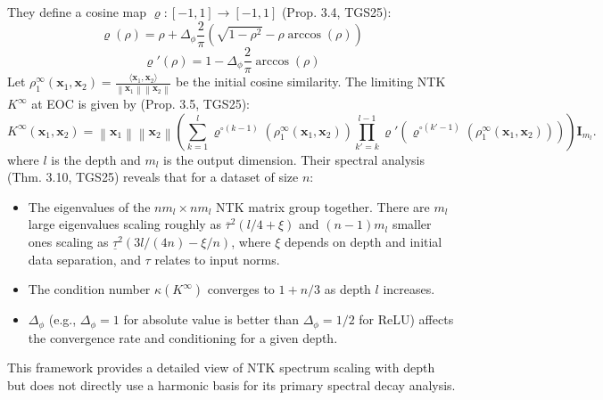 \documentclass{article}
\begin{document}
They define a cosine map $\varrho: [-1,1] \to [-1,1]$ (Prop. 3.4, TGS25):
\begin{equation}
    \varrho(\rho) = \rho + \Delta_\phi \frac{2}{\pi}\left( \sqrt{1-\rho^2} - \rho \arccos(\rho) \right)
\end{equation}
\begin{equation}
    \varrho'(\rho) = 1 - \Delta_\phi \frac{2}{\pi}\arccos(\rho)
\end{equation}
Let $\rho_1^{\infty}(\mathbf{x}_1, \mathbf{x}_2) = \frac{\langle \mathbf{x}_1, \mathbf{x}_2 \rangle}{\left\lVert\mathbf{x}_1\right\rVert \left\lVert\mathbf{x}_2\right\rVert}$ be the initial cosine similarity. The limiting NTK $K^{\infty}$ at EOC is given by (Prop. 3.5, TGS25):
\begin{equation}
    K^{\infty}(\mathbf{x}_1, \mathbf{x}_2) = \left\lVert\mathbf{x}_1\right\rVert \left\lVert\mathbf{x}_2\right\rVert \left( \sum_{k=1}^l \varrho^{\circ (k-1)}\left( \rho_1^{\infty}(\mathbf{x}_1, \mathbf{x}_2) \right) \prod_{k'=k}^{l-1} \varrho'\left( \varrho^{\circ (k'-1)}\left( \rho_1^{\infty}(\mathbf{x}_1, \mathbf{x}_2) \right) \right) \right) \mathbf{I}_{m_l}.
    \label{eq:NTK_TGS25}
\end{equation}
where $l$ is the depth and $m_l$ is the output dimension. Their spectral analysis (Thm. 3.10, TGS25) reveals that for a dataset of size $n$:
\begin{itemize}
    \item The eigenvalues of the $nm_l \times nm_l$ NTK matrix group together. There are $m_l$ large eigenvalues scaling roughly as $\overline{\tau}^2 (l/4 + \xi)$ and $(n-1)m_l$ smaller ones scaling as $\underline{\tau}^2 (3l/(4n) - \xi/n)$, where $\xi$ depends on depth and initial data separation, and $\tau$ relates to input norms.
    \item The condition number $\kappa(K^{\infty})$ converges to $1 + n/3$ as depth $l$ increases.
    \item $\Delta_\phi$ (e.g., $\Delta_\phi=1$ for absolute value is better than $\Delta_\phi=1/2$ for ReLU) affects the convergence rate and conditioning for a given depth.
\end{itemize}
This framework provides a detailed view of NTK spectrum scaling with depth but does not directly use a harmonic basis for its primary spectral decay analysis.
\end{document}
